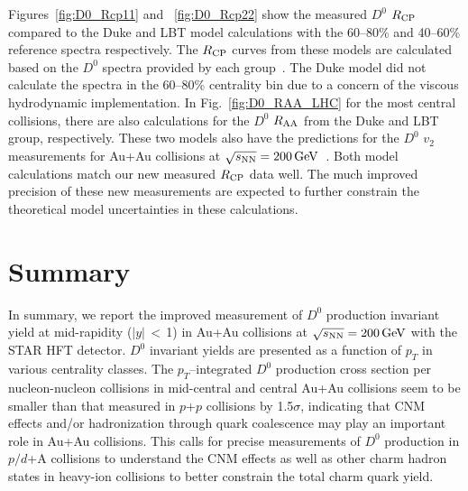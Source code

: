 \documentclass[%
 reprint,	
 amsmath,amssymb,
 aps,
 prc,
]{revtex4-1}
\begin{document}
Figures~\ref{fig:D0_Rcp11} and ~\ref{fig:D0_Rcp22} show the measured $D^0$ $R_{\rm CP}$ compared to the Duke and LBT model calculations with the 60--80\% and 40--60\% reference spectra respectively. The $R_{\rm CP}$ curves from these models are calculated based on the $D^0$ spectra provided by each group~\cite{Cao:2016gvr,LBT:private,Xu:2017obm}. The Duke model did not calculate the spectra in the 60--80\% centrality bin due to a concern of the viscous hydrodynamic implementation. In Fig.~\ref{fig:D0_RAA_LHC} for the most central collisions, there are also calculations for the $D^0$ $R_{\rm AA}$ from the Duke and LBT group, respectively. These two models also have the predictions for the $D^0$ $v_2$ measurements for Au+Au collisions at ${\sqrt{s_{\rm NN}} = \rm{200\,GeV}}$~\cite{Star_D_v2}. %
Both model calculations match our new measured $R_{\rm CP}$ data well. The much improved precision of these new measurements are expected to further constrain the theoretical model uncertainties in these calculations.


\section{Summary}
\label{summary}

In summary, we report the improved measurement of $D^0$ production invariant yield at mid-rapidity ($|y|$\,$<$\,1) in Au+Au collisions at ${\sqrt{s_{\rm NN}} = \rm{200\,GeV}}$ with the STAR HFT detector. $D^0$ invariant yields are presented as a function of $p_{T}$ in various centrality classes. The $p_{T}$--integrated $D^0$ production cross section per nucleon-nucleon collisions in mid-central and central Au+Au collisions seem to be smaller than that measured in $p$+$p$ collisions by 1.5$\sigma$, indicating that CNM effects and/or hadronization through quark coalescence may play an important role in Au+Au collisions. This calls for precise measurements of $D^0$ production in $p/d$+A collisions to understand the CNM effects as well as other charm hadron states in heavy-ion collisions to better constrain the total charm quark yield. 
\end{document}
